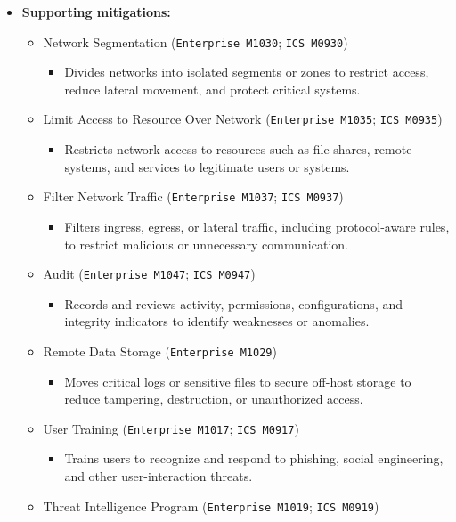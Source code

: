 \documentclass[10pt,a4paper,oneside]{report}
\begin{document}
\begin{itemize}
\item \textbf{Supporting mitigations:}
\begin{itemize}
\item Network Segmentation (\texttt{Enterprise M1030}; \texttt{ICS M0930})
\begin{itemize}
\item Divides networks into isolated segments or zones to restrict access, reduce lateral movement, and protect critical systems.
\end{itemize}
\item Limit Access to Resource Over Network (\texttt{Enterprise M1035}; \texttt{ICS M0935})
\begin{itemize}
\item Restricts network access to resources such as file shares, remote systems, and services to legitimate users or systems.
\end{itemize}
\item Filter Network Traffic (\texttt{Enterprise M1037}; \texttt{ICS M0937})
\begin{itemize}
\item Filters ingress, egress, or lateral traffic, including protocol-aware rules, to restrict malicious or unnecessary communication.
\end{itemize}
\item Audit (\texttt{Enterprise M1047}; \texttt{ICS M0947})
\begin{itemize}
\item Records and reviews activity, permissions, configurations, and integrity indicators to identify weaknesses or anomalies.
\end{itemize}
\item Remote Data Storage (\texttt{Enterprise M1029})
\begin{itemize}
\item Moves critical logs or sensitive files to secure off-host storage to reduce tampering, destruction, or unauthorized access.
\end{itemize}
\item User Training (\texttt{Enterprise M1017}; \texttt{ICS M0917})
\begin{itemize}
\item Trains users to recognize and respond to phishing, social engineering, and other user-interaction threats.
\end{itemize}
\item Threat Intelligence Program (\texttt{Enterprise M1019}; \texttt{ICS M0919})

\end{itemize}
\end{itemize}
\end{document}
